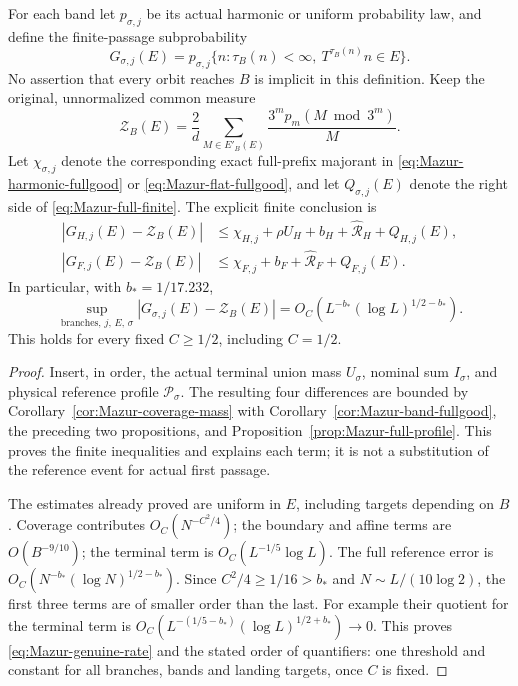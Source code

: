 \begin{theorem}
\label{thm:Mazur-genuine-rate}
For each band let $p_{\sigma,j}$ be its actual harmonic or uniform
probability law, and define the finite-passage subprobability
\[
 G_{\sigma,j}(E)=
 p_{\sigma,j}\{n:\tau_B(n)<\infty,\ T^{\tau_B(n)}n\in E\}.
\]
No assertion that every orbit reaches $B$ is implicit in this definition.
Keep the original, unnormalized common measure
\[
 \mathcal Z_B(E)=\frac2d\sum_{M\in E'_B(E)}
                         \frac{3^m p_m(M\bmod3^m)}M.
\]
Let $\chi_{\sigma,j}$ denote the corresponding exact full-prefix
majorant in \eqref{eq:Mazur-harmonic-fullgood} or
\eqref{eq:Mazur-flat-fullgood}, and let $Q_{\sigma,j}(E)$ denote the
right side of \eqref{eq:Mazur-full-finite}. The explicit finite conclusion is
\begin{align}
 |G_{H,j}(E)-\mathcal Z_B(E)|
 &\le\chi_{H,j}+\rho U_H+b_H+
                  \widehat{\mathcal R}_H+Q_{H,j}(E),\nonumber\\
 |G_{F,j}(E)-\mathcal Z_B(E)|
 &\le\chi_{F,j}+b_F+
                  \widehat{\mathcal R}_F+Q_{F,j}(E).
 \label{eq:Mazur-genuine-four}
\end{align}
In particular, with $b_*=1/17.232$,
\begin{equation}
 \sup_{\text{branches},\,j,\,E,\,\sigma}
 |G_{\sigma,j}(E)-\mathcal Z_B(E)|
 =O_C\!\left(L^{-b_*}(\log L)^{1/2-b_*}\right).
 \label{eq:Mazur-genuine-rate}
\end{equation}
This holds for every fixed $C\ge1/2$, including $C=1/2$.
\end{theorem}
\begin{proof}
Insert, in order, the actual terminal union mass $U_\sigma$, nominal
sum $I_\sigma$, and physical reference profile $\mathcal P_\sigma$.
The resulting four differences are bounded by
Corollary~\ref{cor:Mazur-coverage-mass} with
Corollary~\ref{cor:Mazur-band-fullgood}, the preceding two propositions,
and Proposition~\ref{prop:Mazur-full-profile}. This proves the finite
inequalities and explains each term; it is not a substitution of the
reference event for actual first passage.

The estimates already proved are uniform in $E$, including targets
depending on $B$. Coverage contributes
$O_C(N^{-C^2/4})$; the boundary and affine terms are $O(B^{-9/10})$;
the terminal term is $O_C(L^{-1/5}\log L)$.
The full reference error is
$O_C(N^{-b_*}(\log N)^{1/2-b_*})$.
Since $C^2/4\ge1/16>b_*$ and $N\sim L/(10\log2)$, the first three
terms are of smaller order than the last. For example their quotient
for the terminal term is
$O_C(L^{-(1/5-b_*)}(\log L)^{1/2+b_*})\to0$.
This proves \eqref{eq:Mazur-genuine-rate} and the stated order of
quantifiers: one threshold and constant for all branches, bands and
landing targets, once $C$ is fixed.
\end{proof}

